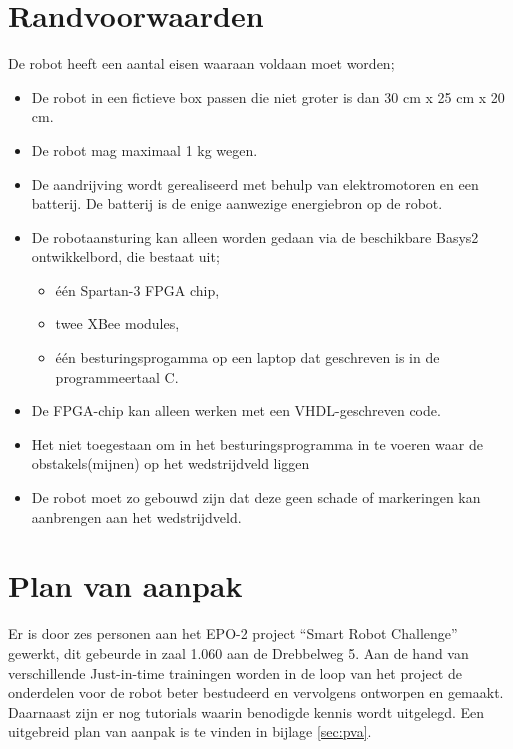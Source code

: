 \documentclass{report}
\begin{document}
\newpage
\section{Randvoorwaarden}

De robot heeft een aantal eisen waaraan voldaan moet worden;

\begin{itemize}

\item
De robot in een fictieve box passen die niet groter is dan 30 cm x 25 cm x 20 cm.

\item
De robot mag maximaal 1 kg wegen.

\item
De aandrijving wordt gerealiseerd met behulp van elektromotoren en een batterij.
De batterij is de enige aanwezige energiebron op de robot.

\item
De robotaansturing kan alleen worden gedaan via de beschikbare Basys2 ontwikkelbord, die bestaat uit;

\begin{itemize}

\item
één Spartan-3 FPGA chip,

\item
twee XBee modules,

\item
één besturingsprogamma op een laptop dat geschreven is in de programmeertaal C.


\end{itemize}

\item
De FPGA-chip kan alleen werken met een VHDL-geschreven code.

\item
Het niet toegestaan om in het besturingsprogramma in te voeren waar de obstakels(mijnen) op het wedstrijdveld liggen 

\item
De robot moet zo gebouwd zijn dat deze geen schade of markeringen kan aanbrengen aan het wedstrijdveld.

\end{itemize}

\section{Plan van aanpak}

Er is door zes personen aan het EPO-2 project “Smart Robot Challenge” gewerkt, dit gebeurde in zaal 1.060 aan de Drebbelweg 5.
Aan de hand van verschillende Just-in-time trainingen worden in de loop van het project de onderdelen voor de robot beter bestudeerd en vervolgens ontworpen en gemaakt.
Daarnaast zijn er nog tutorials waarin benodigde kennis wordt uitgelegd.
Een uitgebreid plan van aanpak is te vinden in bijlage \ref{sec:pva}.
\end{document}
